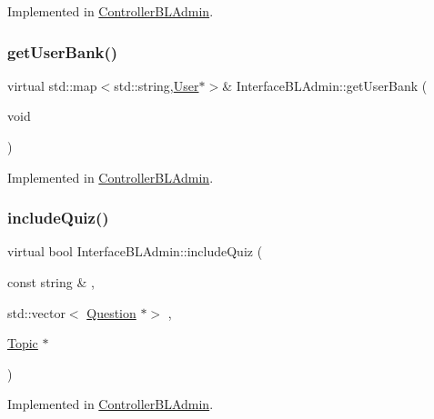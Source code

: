 Implemented in \hyperlink{class_controller_b_l_admin_a86f1e998ca81cc440594d62e60fc1ed9}{Controller\+B\+L\+Admin}.

\mbox{\label{class_interface_b_l_admin_a785c49557dc1dd6a955ee12db1bb6925}} 
\subsubsection{\texorpdfstring{get\+User\+Bank()}{getUserBank()}}
{\footnotesize\ttfamily virtual std\+::map$<$std\+::string,\hyperlink{class_user}{User}$\ast$$>$\& Interface\+B\+L\+Admin\+::get\+User\+Bank (\begin{DoxyParamCaption}\item[{void}]{ }\end{DoxyParamCaption})\hspace{0.3cm}{\ttfamily [pure virtual]}}



Implemented in \hyperlink{class_controller_b_l_admin_add75e8118f5e4f37775edfcb104281aa}{Controller\+B\+L\+Admin}.

\mbox{\label{class_interface_b_l_admin_aca0cf080ee23134183cf70dd094edfe2}} 
\subsubsection{\texorpdfstring{include\+Quiz()}{includeQuiz()}}
{\footnotesize\ttfamily virtual bool Interface\+B\+L\+Admin\+::include\+Quiz (\begin{DoxyParamCaption}\item[{const string \&}]{,  }\item[{std\+::vector$<$ \hyperlink{class_question}{Question} $\ast$$>$}]{,  }\item[{\hyperlink{class_topic}{Topic} $\ast$}]{ }\end{DoxyParamCaption})\hspace{0.3cm}{\ttfamily [pure virtual]}}



Implemented in \hyperlink{class_controller_b_l_admin_a995da6bb9402ddb388794ff6410aebe5}{Controller\+B\+L\+Admin}.

